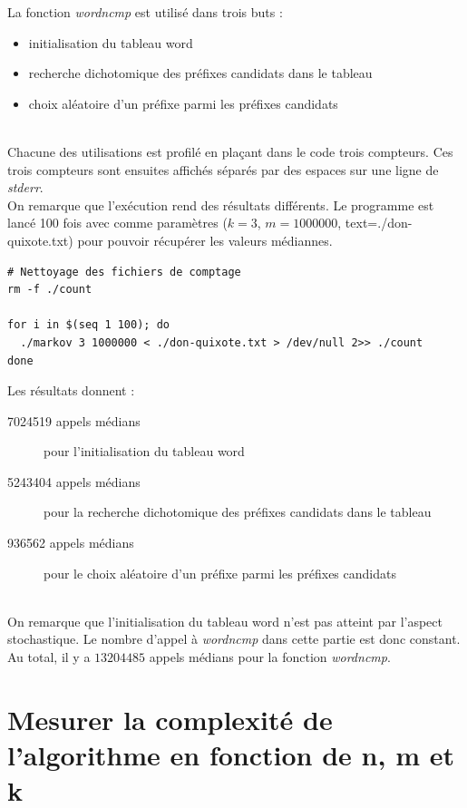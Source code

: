 \documentclass[10pt, a4paper]{article}
\begin{document}
La fonction \emph{wordncmp} est utilisé dans trois buts : \\
\begin{itemize}
  \item initialisation du tableau word
  \item recherche dichotomique des préfixes candidats dans le tableau
  \item choix aléatoire d'un préfixe parmi les préfixes candidats
\end{itemize}
~\\

Chacune des utilisations est profilé en plaçant dans le code trois compteurs.
Ces trois compteurs sont ensuites affichés séparés par des espaces sur une
ligne de \emph{stderr}. \\

On remarque que l'exécution rend des résultats différents. Le programme est
lancé 100 fois avec comme paramètres ($k=3$, $m=1000000$,
text=./don-quixote.txt) pour pouvoir récupérer les valeurs médiannes. \\

\begin{verbatim}
# Nettoyage des fichiers de comptage
rm -f ./count

for i in $(seq 1 100); do
  ./markov 3 1000000 < ./don-quixote.txt > /dev/null 2>> ./count
done
\end{verbatim}

Les résultats donnent : \\
\begin{description}
  \item[7024519 appels médians] pour l'initialisation du tableau word
  \item[5243404 appels médians] pour la recherche dichotomique des préfixes
    candidats dans le tableau
  \item[936562 appels médians] pour le choix aléatoire d'un préfixe parmi les
    préfixes candidats
\end{description}
~\\

On remarque que l'initialisation du tableau word n'est pas atteint par l'aspect
stochastique. Le nombre d'appel à \emph{wordncmp} dans cette partie est donc
constant. \\

Au total, il y a $13204485$ appels médians pour la fonction \emph{wordncmp}. \\

\section{Mesurer la complexité de l'algorithme en fonction de n, m et k}
\end{document}
